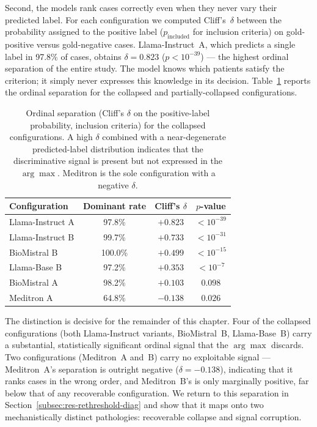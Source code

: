 Second, the models rank cases correctly even when they never vary their 
predicted label. For each configuration we computed Cliff's~$\delta$ 
between the probability assigned to the positive label 
($p_{\text{included}}$ for inclusion criteria) on gold-positive versus 
gold-negative cases. Llama-Instruct~A, which predicts a single label in 
97.8\% of cases, obtains $\delta = 0.823$ ($p < 10^{-39}$) --- the 
highest ordinal separation of the entire study. The model knows which 
patients satisfy the criterion; it simply never expresses this knowledge 
in its decision. Table~\ref{tab:res-signal-expression} reports the 
ordinal separation for the collapsed and partially-collapsed 
configurations.

\begin{table}[htbp]
    \centering
    \caption{Ordinal separation (Cliff's $\delta$ on the positive-label 
        probability, inclusion criteria) for the collapsed configurations. 
        A high $\delta$ combined with a near-degenerate predicted-label 
        distribution indicates that the discriminative signal is present 
        but not expressed in the $\arg\max$. Meditron is the sole 
        configuration with a negative $\delta$.}
    \label{tab:res-signal-expression}
    \small
    \begin{tabular}{@{}lccc@{}}
        \toprule
        \textbf{Configuration} & 
        \textbf{Dominant rate} & 
        \textbf{Cliff's $\delta$} & 
        \textbf{$p$-value} \\
        \midrule
        Llama-Instruct A & 97.8\%  & $+0.823$ & $<10^{-39}$ \\
        Llama-Instruct B & 99.7\%  & $+0.733$ & $<10^{-31}$ \\
        BioMistral B     & 100.0\% & $+0.499$ & $<10^{-15}$ \\
        Llama-Base B     & 97.2\%  & $+0.353$ & $<10^{-7}$  \\
        BioMistral A     & 98.2\%  & $+0.103$ & $0.098$     \\
        Meditron A       & 64.8\%  & $-0.138$ & $0.026$     \\
        \bottomrule
    \end{tabular}
\end{table}

The distinction is decisive for the remainder of this chapter. Four of 
the collapsed configurations (both Llama-Instruct variants, BioMistral~B, 
Llama-Base~B) carry a substantial, statistically significant ordinal 
signal that the $\arg\max$ discards. Two configurations (Meditron~A 
and~B) carry no exploitable signal --- Meditron~A's separation is 
outright negative ($\delta = -0.138$), indicating that it ranks cases in 
the wrong order, and Meditron~B's is only marginally positive, far below 
that of any recoverable configuration. We return to this separation in 
Section~\ref{subsec:res-rethreshold-diag} and show that it maps onto two 
mechanistically distinct pathologies: recoverable collapse and signal 
corruption.

